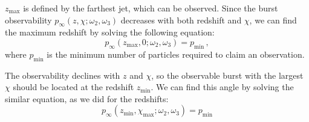\documentclass{article}
\begin{document}
$z_\text{max}$ is defined by the farthest jet, which can be
observed. Since the burst observability
$p_\infty\left(z,\chi;\omega_2,\omega_3\right)$ decreases with both
redshift and $\chi$, we can find the maximum redshift by solving the
following equation:
\begin{equation}
p_\infty\left(z_\text{max},0;\omega_2,\omega_3\right) = p_\text{min} \,,
\end{equation}
where $p_\text{min}$ is the minimum number of particles required to claim an observation.

The observability declines with $z$ and $\chi$, so the observable
burst with the largest $\chi$ should be located at the redshift
$z_\text{min}$. We can find this angle by solving the similar
equation, as we did for the redshifts:
\begin{equation}
  	p_\infty\left(z_\text{min},\chi_\text{max};\omega_2,\omega_3\right) = p_\text{min}
\end{equation}
\end{document}
